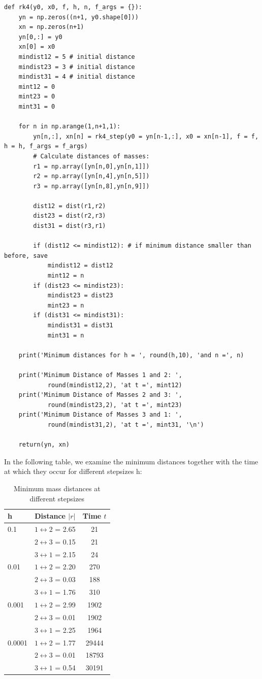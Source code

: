 \documentclass{article}
\begin{document}
\begin{lstlisting}
def rk4(y0, x0, f, h, n, f_args = {}):
    yn = np.zeros((n+1, y0.shape[0]))
    xn = np.zeros(n+1)
    yn[0,:] = y0
    xn[0] = x0
    mindist12 = 5 # initial distance
    mindist23 = 3 # initial distance
    mindist31 = 4 # initial distance
    mint12 = 0
    mint23 = 0
    mint31 = 0
    
    for n in np.arange(1,n+1,1):
        yn[n,:], xn[n] = rk4_step(y0 = yn[n-1,:], x0 = xn[n-1], f = f, h = h, f_args = f_args)
        # Calculate distances of masses:
        r1 = np.array([yn[n,0],yn[n,1]])
        r2 = np.array([yn[n,4],yn[n,5]])
        r3 = np.array([yn[n,8],yn[n,9]])
        
        dist12 = dist(r1,r2)
        dist23 = dist(r2,r3)
        dist31 = dist(r3,r1)

        if (dist12 <= mindist12): # if minimum distance smaller than before, save
            mindist12 = dist12
            mint12 = n 
        if (dist23 <= mindist23):
            mindist23 = dist23
            mint23 = n 
        if (dist31 <= mindist31):
            mindist31 = dist31
            mint31 = n 

    print('Minimum distances for h = ', round(h,10), 'and n =', n)

    print('Minimum Distance of Masses 1 and 2: ',
            round(mindist12,2), 'at t =', mint12)
    print('Minimum Distance of Masses 2 and 3: ',
            round(mindist23,2), 'at t =', mint23)
    print('Minimum Distance of Masses 3 and 1: ',
            round(mindist31,2), 'at t =', mint31, '\n')

    return(yn, xn)
\end{lstlisting}

In the following table, we examine the minimum distances together with the time
at which they occur for different stepsizes h:
\begin{table}[H]
    \centering
    \begin{tabular}{lcc}
	h & Distance $|r|$ & Time $t$ \\
	\toprule 
	0.1 & $1 \leftrightarrow 2$ = 2.65 & 21 \\ 
	& $2 \leftrightarrow 3$ = 0.15 & 21 \\
	& $3 \leftrightarrow 1$ = 2.15 & 24 \\ \midrule
	0.01 & $1 \leftrightarrow 2$ = 2.20 & 270 \\ 
	& $2 \leftrightarrow 3$ = 0.03 & 188 \\
	& $3 \leftrightarrow 1$ = 1.76 & 310 \\ \midrule
	0.001 & $1 \leftrightarrow 2$ = 2.99 & 1902 \\ 
	& $2 \leftrightarrow 3$ = 0.01 & 1902 \\
	& $3 \leftrightarrow 1$ = 2.25 & 1964 \\ \midrule
	0.0001 & $1 \leftrightarrow 2$ = 1.77 & 29444 \\ 
	& $2 \leftrightarrow 3$ = 0.01 & 18793 \\
	& $3 \leftrightarrow 1$ = 0.54 & 30191 \\
\bottomrule 
\end{tabular}
\caption{Minimum mass distances at different stepsizes}
\end{table}
\end{document}
